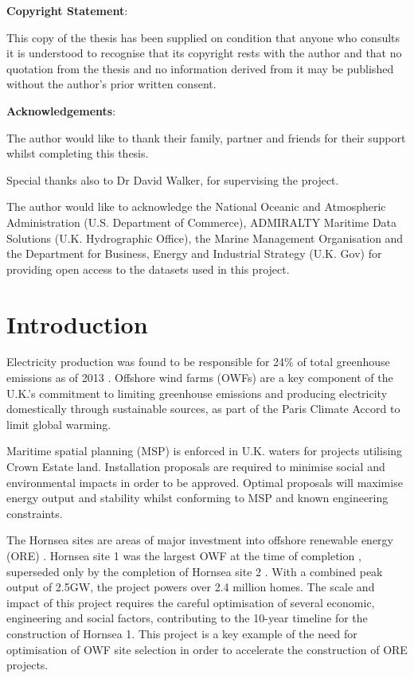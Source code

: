 \documentclass[preprint,12pt]{elsarticle}
\begin{document}
\begin{frontmatter}
\textbf{Copyright Statement}:

This copy of the thesis has been supplied on condition that anyone who consults it is understood to
recognise that its copyright rests with the author and that no quotation from the thesis and no
information derived from it may be published without the author’s prior written consent.

\clearpage

\textbf{Acknowledgements}:

The author would like to thank their family, partner and friends for their support whilst completing this thesis. 

Special thanks also to Dr David Walker, for supervising the project.

The author would like to acknowledge the National Oceanic and Atmospheric Administration (U.S. Department of Commerce), ADMIRALTY Maritime Data Solutions (U.K. Hydrographic Office), the Marine Management Organisation and the Department for Business, Energy and Industrial Strategy (U.K. Gov) for providing open access to the datasets used in this project.

\clearpage

\end{frontmatter}


\section{Introduction}
Electricity production was found to be responsible for 24\% of total greenhouse emissions as of 2013 \cite{Lin2013}. Offshore wind farms (OWFs) are a key component of the U.K.’s commitment to limiting greenhouse emissions and producing electricity domestically through sustainable sources, as part of the Paris Climate Accord to limit global warming.

Maritime spatial planning (MSP) \cite{JAY2010493} is enforced in U.K. waters for projects utilising Crown Estate land. Installation proposals are required to minimise social and environmental impacts in order to be approved. Optimal proposals will maximise energy output and stability whilst conforming to MSP and known engineering constraints.

The Hornsea sites are areas of major investment into offshore renewable energy (ORE) \cite{radov2017offshore}. Hornsea site 1 was the largest OWF at the time of completion \cite{Orsted2018}, superseded only by the completion of Hornsea site 2 \cite{Orsted2022}. With a combined peak output of 2.5GW, the project powers over 2.4 million homes. The scale and impact of this project requires the careful optimisation of several economic, engineering and social factors, contributing to the 10-year timeline for the construction of Hornsea 1. This project is a key example of the need for optimisation of OWF site selection in order to accelerate the construction of ORE projects.
\end{document}
